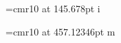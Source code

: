 \nopagenumbers
\font\myfont=cmr10 at 145.678pt\myfont
i\par
\font\myfont=cmr10 at 457.12346pt\myfont
m\par
\bye
